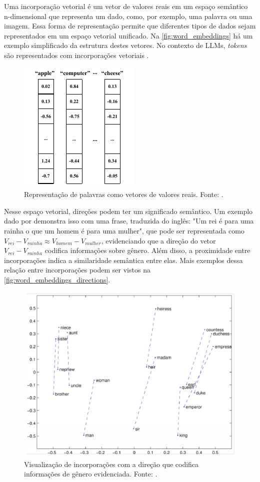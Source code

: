 Uma incorporação vetorial é um vetor de valores reais em um espaço semântico n-dimensional que representa um dado, como, por exemplo, uma palavra ou uma imagem. Essa
forma de representação permite que diferentes tipos de dados sejam representados em um espaço vetorial unificado. Na \autoref{fig:word_embeddings} há um exemplo
simplificado da estrutura destes vetores. No contexto de \acp{LLM}, \textit{tokens} são representados com incorporações vetoriais \cite{word_embedding, mllm_survey_2023}.

\begin{figure}[ht]
      \centering
      \includegraphics[width=0.4\columnwidth,keepaspectratio]{images/word_embeddings.pdf}
      \caption{\small Representação de palavras como vetores de valores reais. Fonte: \textcite{word_embedding}.}
      \label{fig:word_embeddings}
\end{figure}

Nesse espaço vetorial, direções podem ter um significado semântico. Um exemplo dado por \textcite{glove} demonstra isso com uma frase, traduzida do inglês: "Um rei é para
uma rainha o que um homem é para uma mulher", que pode ser representada como \textit{$V_{rei} - V_{rainha} \approx V_{homem} - V_{mulher}$}, evidenciando que a direção do
vetor \textit{$V_{rei} - V_{rainha}$} codifica informações sobre gênero. Além disso, a proximidade entre incorporações indica a similaridade semântica entre elas. Mais
exemplos dessa relação entre incorporações podem ser vistos na \autoref{fig:word_embeddings_directions}.

\begin{figure}[ht]
      \centering
      \includegraphics[width=0.7\columnwidth,keepaspectratio]{images/word_embeddings_directions.png}
      \caption{\small Visualização de incorporações com a direção que codifica informações de gênero evidenciada. Fonte: \textcite{word_embedding}.}
      \label{fig:word_embeddings_directions}
\end{figure}

